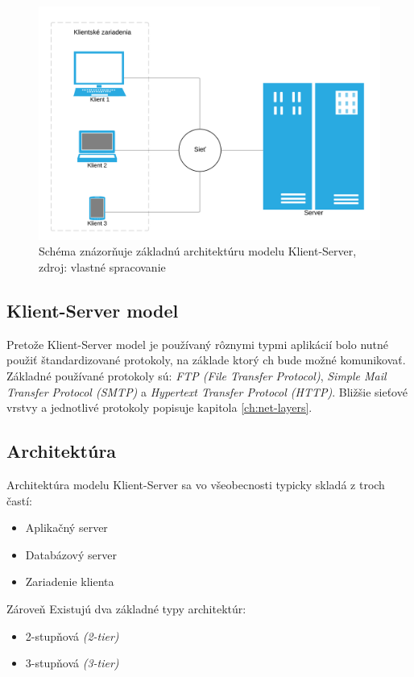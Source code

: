 \documentclass[
  printed, %
  table,   %
  lof,     %
  lot,     %
]{fithesis3}
\begin{document}
\begin{figure}[h]
  \centering
    \includegraphics[width=.99\textwidth]{images/C-S-basic.png}
  \caption{Schéma znázorňuje základnú architektúru modelu Klient-Server, zdroj:
  vlastné spracovanie}
  \label{fig:cs-basic}
\end{figure}

\subsection{Klient-Server model}
Pretože Klient-Server model je používaný rôznymi typmi aplikácií bolo nutné
použiť štandardizované protokoly, na základe ktorý ch bude možné komunikovať.
Základné používané protokoly sú: \textit{FTP (File Transfer Protocol)},
\textit{Simple Mail Transfer Protocol (SMTP)} a \textit{Hypertext Transfer
Protocol (HTTP)}. Bližšie sieťové vrstvy a jednotlivé protokoly popisuje
kapitola \ref{ch:net-layers}.

\subsection{Architektúra}
Architektúra modelu Klient-Server sa vo všeobecnosti typicky skladá z troch 
častí:
\begin{itemize}
	\item Aplikačný server
	\item Databázový server
	\item Zariadenie klienta
\end{itemize}
Zároveň Existujú dva základné typy architektúr: 
\begin{itemize}
	\item 2-stupňová \textit{(2-tier)}
	\item 3-stupňová \textit{(3-tier)}
\end{itemize}
\end{document}
